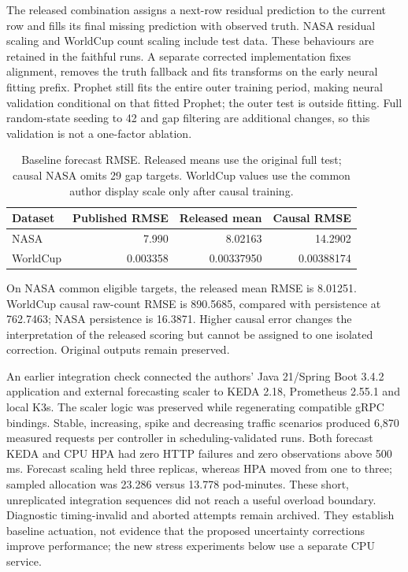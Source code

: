\documentclass[11pt,a4paper]{article}
\begin{document}
The released combination assigns a next-row residual prediction to the current row and fills its final missing prediction with observed truth. NASA residual scaling and WorldCup count scaling include test data. These behaviours are retained in the faithful runs. A separate corrected implementation fixes alignment, removes the truth fallback and fits transforms on the early neural fitting prefix. Prophet still fits the entire outer training period, making neural validation conditional on that fitted Prophet; the outer test is outside fitting. Full random-state seeding to 42 and gap filtering are additional changes, so this validation is not a one-factor ablation.


\begin{table}[htbp]\centering\small\setlength{\tabcolsep}{4pt}
\caption{Baseline forecast RMSE. Released means use the original full test; causal NASA omits 29 gap targets. WorldCup values use the common author display scale only after causal training.}\label{tab:baseline}
\begin{tabular}{lrrr}\toprule
Dataset & Published RMSE & Released mean & Causal RMSE\\\midrule
NASA & 7.990 & 8.02163 & 14.2902\\
WorldCup & 0.003358 & 0.00337950 & 0.00388174\\
\bottomrule\end{tabular}\end{table}


On NASA common eligible targets, the released mean RMSE is 8.01251. WorldCup causal raw-count RMSE is 890.5685, compared with persistence at 762.7463; NASA persistence is 16.3871. Higher causal error changes the interpretation of the released scoring but cannot be assigned to one isolated correction. Original outputs remain preserved.

An earlier integration check connected the authors' Java 21/Spring Boot 3.4.2 application and external forecasting scaler to KEDA 2.18, Prometheus 2.55.1 and local K3s. The scaler logic was preserved while regenerating compatible gRPC bindings. Stable, increasing, spike and decreasing traffic scenarios produced 6,870 measured requests per controller in scheduling-validated runs. Both forecast KEDA and CPU HPA had zero HTTP failures and zero observations above 500 ms. Forecast scaling held three replicas, whereas HPA moved from one to three; sampled allocation was 23.286 versus 13.778 pod-minutes. These short, unreplicated integration sequences did not reach a useful overload boundary. Diagnostic timing-invalid and aborted attempts remain archived. They establish baseline actuation, not evidence that the proposed uncertainty corrections improve performance; the new stress experiments below use a separate CPU service.
\end{document}
